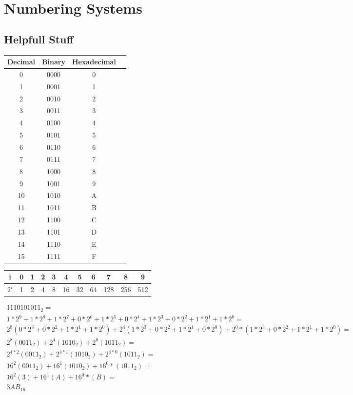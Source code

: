 \chapter{Numbering Systems}
\graphicspath{ {./chapter01/FigWork} }

\section{Helpfull Stuff}

\begin{tabular}{|c|c|c|c|}\hline
    Decimal & Binary & Hexadecimal \\ \hline
    0    & 0000    & 0     \\ \hline
    1    & 0001    & 1     \\ \hline
    2    & 0010    & 2     \\ \hline
    3    & 0011    & 3     \\ \hline
    4    & 0100    & 4     \\ \hline
    5    & 0101    & 5     \\ \hline
    6    & 0110    & 6     \\ \hline
    7    & 0111    & 7     \\ \hline
    8    & 1000    & 8     \\ \hline
    9    & 1001    & 9     \\ \hline
    10   & 1010    & A     \\ \hline
    11   & 1011    & B     \\ \hline
    12   & 1100    & C     \\ \hline
    13   & 1101    & D     \\ \hline
    14   & 1110    & E     \\ \hline
    15   & 1111    & F     \\ \hline
\end{tabular}
\vspace{0.5in}

\begin{tabular}{|c|c|c|c|c|c|c|c|c|c|c|}\hline
    i    & 0 & 1 &  2 &  3 &  4 &  5 &  6 &  7  &  8  &  9  \\ \hline
    $2^i$ & 1 & 2 &  4 &  8 & 16 & 32 & 64 & 128 & 256 &  512\\ \hline
\end{tabular}
\vspace{0.5in}

{\tiny
    $
    \begin{array}{l}
        1110101011_2= \\
        1*2^9+1*2^8+1*2^7+0*2^6+1*2^5+0*2^4+1*2^3+0*2^2+1*2^1+1*2^0 = \\
        2^8(0*2^3+0*2^2+1*2^1+1*2^0) + 2^4(1*2^3+0*2^2+1*2^1+0*2^0) + 2^0*(1*2^3+0*2^2+1*2^1+1*2^0) =\\
        2^8(0011_2) + 2^4(1010_2) +  2^0(1011_2) =\\
        2^{4*2}(0011_2) + 2^{4*1}(1010_2) +  2^{4*0}(1011_2) =\\
        16^2(0011_2) + 16^1(1010_2) + 16^0*(1011_2) =\\
        16^2(3) + 16^1(A) + 16^0*(B) =\\
        3AB_{16}
    \end{array}$
}

